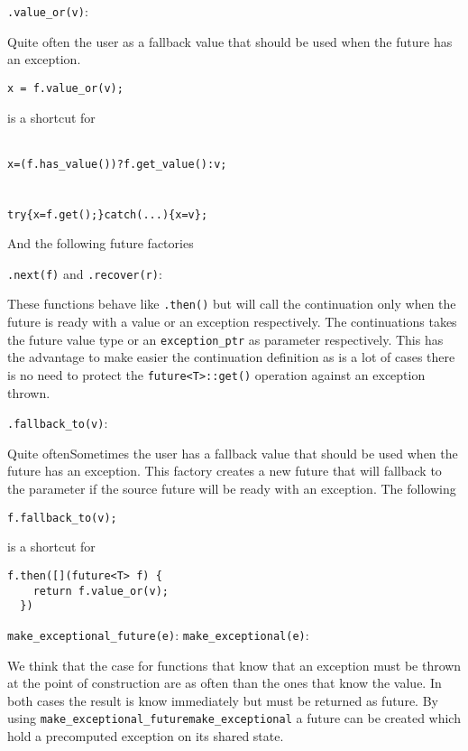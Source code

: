 \documentclass[a4paper,10pt]{article}
\newcommand{\cpp}[1]{\lstinline{#1}}
\newcommand{\suppress}[1]{\colorbox{suppress_color}{#1}}
\newcommand{\update}[1]{\colorbox{update_color}{#1}}
\begin{document}
\cpp{.value_or(v)}:

Quite often the user as a fallback value that should be used when the future has an exception.

\begin{lstlisting}[xleftmargin=0pt]
x = f.value_or(v);
\end{lstlisting}

is a shortcut for 
\begin{alltt}
\suppress{
x = (f.has_value()) ? f.get_value() : v;
}
\update{
try \{ x = f.get(); \} catch(...) \{ x = v \};
}
\end{alltt}

And the following future factories

\cpp{.next(f)} and \cpp{.recover(r)}:

These functions behave like \cpp{.then()} but will call the continuation only when the future is ready with a value or an exception respectively. The continuations takes the future value type or an \cpp{exception_ptr} as parameter respectively. This has the advantage to make easier the continuation definition as is a lot of cases there is no need to protect the \cpp{future<T>::get()} operation against an exception thrown.

\cpp{.fallback_to(v)}:

\suppress{Quite often}\update{Sometimes} the user has a fallback value that should be used when the future has an exception. This factory creates a new future that will fallback to the parameter if the source future will be ready with an exception. The following 

\begin{lstlisting}[xleftmargin=0pt]
  f.fallback_to(v);
\end{lstlisting}

is a shortcut for 

\begin{lstlisting}[xleftmargin=0pt]
  f.then([](future<T> f) {
    return f.value_or(v);
  })
\end{lstlisting}

\suppress{
\cpp{make_exceptional_future(e)}:
}
\update{
\cpp{make_exceptional(e)}:
}

We think that the case for functions that know that an exception must be thrown at the point of construction are as often than the ones that know the value. In both cases the result is know immediately but must be returned as future. By using \suppress{\cpp{make_exceptional_future}}\update{\cpp{make_exceptional}} a future can be created which hold a precomputed exception on its shared state. 
\end{document}
